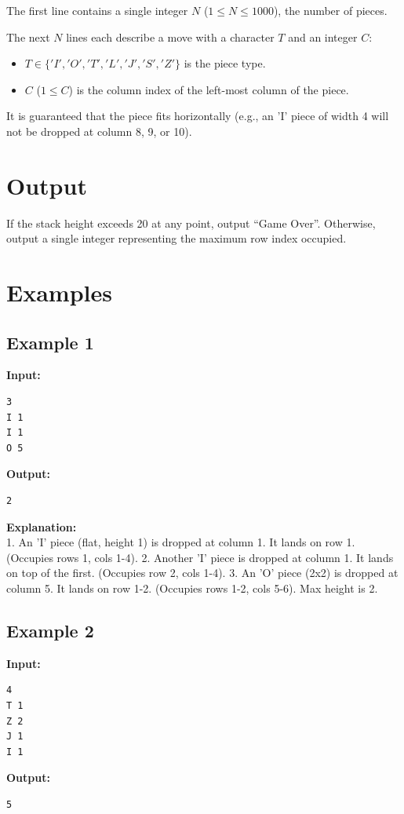\documentclass[11pt, letterpaper]{article}
\begin{document}
The first line contains a single integer $N$ ($1 \le N \le 1000$), the number of pieces.

The next $N$ lines each describe a move with a character $T$ and an integer $C$:
\begin{itemize}
    \item $T \in \{'I', 'O', 'T', 'L', 'J', 'S', 'Z'\}$ is the piece type.
    \item $C$ ($1 \le C$) is the column index of the left-most column of the piece.
\end{itemize}
It is guaranteed that the piece fits horizontally (e.g., an 'I' piece of width 4 will not be dropped at column 8, 9, or 10).

\section*{Output}

If the stack height exceeds 20 at any point, output ``Game Over''.
Otherwise, output a single integer representing the maximum row index occupied.

\section*{Examples}

\subsection*{Example 1}
\textbf{Input:}
\begin{verbatim}
3
I 1
I 1
O 5
\end{verbatim}

\textbf{Output:}
\begin{verbatim}
2
\end{verbatim}

\textbf{Explanation:} \\
1. An 'I' piece (flat, height 1) is dropped at column 1. It lands on row 1. (Occupies rows 1, cols 1-4).
2. Another 'I' piece is dropped at column 1. It lands on top of the first. (Occupies row 2, cols 1-4).
3. An 'O' piece (2x2) is dropped at column 5. It lands on row 1-2. (Occupies rows 1-2, cols 5-6).
Max height is 2.

\subsection*{Example 2}
\textbf{Input:}
\begin{verbatim}
4
T 1
Z 2
J 1
I 1
\end{verbatim}

\textbf{Output:}
\begin{verbatim}
5
\end{verbatim}
\end{document}
